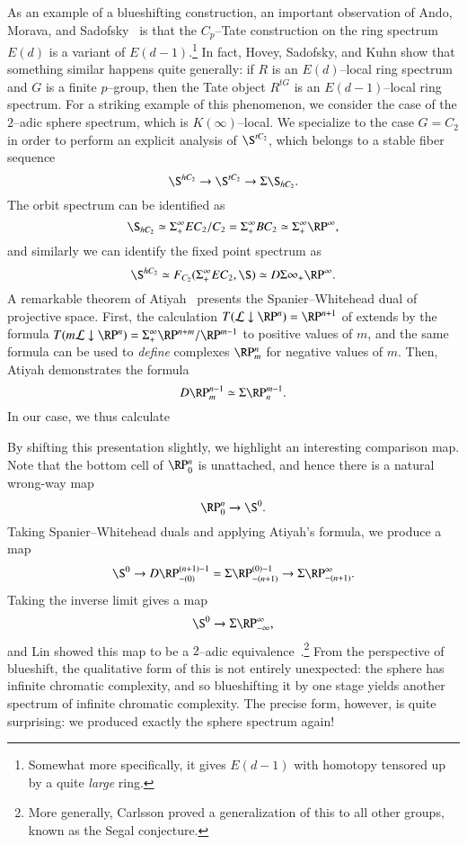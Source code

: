 As an example of a blueshifting construction, an important observation of Ando, Morava, and Sadofsky~\cite{AMS} is that the $C_p$--Tate construction on the ring spectrum $E(d)$ is a variant of $E(d-1)$.\footnote{Somewhat more specifically, it gives $E(d-1)$ with homotopy tensored up by a quite \emph{large} ring.}  In fact, Hovey, Sadofsky, and Kuhn show that something similar happens quite generally: if $R$ is an $E(d)$--local ring spectrum and $G$ is a finite $p$--group, then the Tate object $R^{tG}$ is an $E(d-1)$--local ring spectrum.  For a striking example of this phenomenon, we consider the case of the $2$--adic sphere spectrum, which is $K(\infty)$--local.  We specialize to the case $G = C_2$ in order to perform an explicit analysis of $\S^{tC_2}$, which belongs to a stable fiber sequence \[\S^{hC_2} \to \S^{tC_2} \to \Susp \S_{hC_2}.\]  The orbit spectrum can be identified as \[\S_{hC_2} \simeq \Susp^\infty_+ EC_2 / C_2 = \Susp^\infty_+ BC_2 \simeq \Susp^\infty_+ \RP^\infty,\] and similarly we can identify the fixed point spectrum as \[\S^{hC_2} \simeq F_{C_2}(\Susp^\infty_+ EC_2, \S) \simeq D\Susp\infty_+ \RP^\infty.\]  A remarkable theorem of Atiyah~\cite{Atiyah} presents the Spanier--Whitehead dual of projective space.  First, the calculation $T(\mathcal L \downarrow \RP^n) = \RP^{n+1}$ of  extends by the formula $T(m \mathcal L \downarrow \RP^n) = \Susp^\infty_+ \RP^{n+m} / \RP^{m-1}$ to positive values of $m$, and the same formula can be used to \emph{define} complexes $\RP^n_m$ for negative values of $m$.  Then, Atiyah demonstrates the formula \[D \RP^{n-1}_m \simeq \Susp \RP^{m-1}_n.\]  In our case, we thus calculate
\begin{center}
\end{center}
By shifting this presentation slightly, we highlight an interesting comparison map.  Note that the bottom cell of $\RP^n_0$ is unattached, and hence there is a natural wrong-way map \[\RP^n_0 \to \S^0.\]  Taking Spanier--Whitehead duals and applying Atiyah's formula, we produce a map \[\S^0 \to D \RP^{(n+1)-1}_{-(0)} = \Susp \RP^{(0)-1}_{-(n+1)} \to \Susp \RP^\infty_{-(n+1)}.\]  Taking the inverse limit gives a map \[\S^0 \to \Susp \RP^\infty_{-\infty},\] and Lin showed this map to be a $2$--adic equivalence~\cite{Lin}.\footnote{More generally, Carlsson proved a generalization of this to all other groups, known as the Segal conjecture.}  From the perspective of blueshift, the qualitative form of this is not entirely unexpected: the sphere has infinite chromatic complexity, and so blueshifting it by one stage yields another spectrum of infinite chromatic complexity.  The precise form, however, is quite surprising: we produced exactly the sphere spectrum again!

